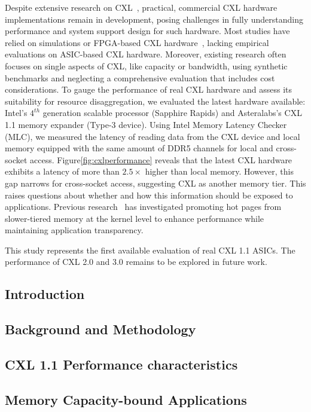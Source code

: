 Despite extensive research on CXL~\cite{cxl_azure,cxlcentric,demystify}, practical, commercial CXL hardware implementations remain in development, posing challenges in fully understanding performance and system support design for such hardware. Most studies have relied on simulations or FPGA-based CXL hardware~\cite{demystify,intelfpga}, lacking empirical evaluations on ASIC-based CXL hardware. Moreover, existing research often focuses on single aspects of CXL, like capacity or bandwidth, using synthetic benchmarks and neglecting a comprehensive evaluation that includes cost considerations. To gauge the performance of real CXL hardware and assess its suitability for resource disaggregation, we evaluated the latest hardware available: Intel's $\text{4}^{th}$ generation scalable processor (Sapphire Rapids) and Asteralabs's CXL 1.1 memory expander (Type-3 device). Using Intel Memory Latency Checker (MLC)\cite{mlc}, we measured the latency of reading data from the CXL device and local memory equipped with the same amount of DDR5 channels for local and cross-socket access. Figure\ref{fig:cxlperformance} reveals that the latest CXL hardware exhibits a latency of more than $2.5\times$ higher than local memory. However, this gap narrows for cross-socket access, suggesting CXL as another memory tier. This raises questions about whether and how this information should be exposed to applications. Previous research~\cite{tpp} has investigated promoting hot pages from slower-tiered memory at the kernel level to enhance performance while maintaining application transparency.

This study represents the first available evaluation of real CXL 1.1 ASICs. The performance of CXL 2.0 and 3.0 remains to be explored in future work.

\subsection{Introduction}
\subsection{Background and Methodology}
\subsection{CXL 1.1 Performance characteristics}
\subsection{Memory Capacity-bound Applications}

